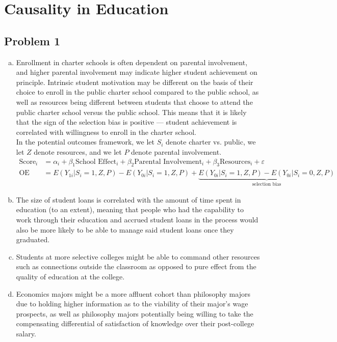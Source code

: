 \documentclass[8pt]{extarticle}
\title{}
\author{}
\date{}
\begin{document}
\section{Causality in Education}%
\subsection{Problem 1}%
\begin{enumerate}[(a)]
  \item Enrollment in charter schools is often dependent on parental involvement, and higher parental involvement may indicate higher student achievement on principle. Intrinsic student motivation may be different on the basis of their choice to enroll in the public charter school compared to the public school, as well as resources being different between students that choose to attend the public charter school versus the public school. This means that it is likely that the sign of the selection bias is positive --- student achievement is correlated with willingness to enroll in the charter school.\\

    In the potential outcomes framework, we let $S_i$ denote charter vs. public, we let $Z$ denote resources, and we let $P$ denote parental involvement.
    \begin{align*}
      \text{Score}_i &= \alpha_i + \beta_1\text{School Effect}_i + \beta_2\text{Parental Involvement}_i + \beta_3\text{Resources}_i + \varepsilon\\
      \text{OE} &= E(Y_{1i}|S_i=1,Z,P) - E(Y_{0i}|S_i=1,Z,P) + \underbrace{E(Y_{0i}|S_i=1,Z,P)-E(Y_{0i}|S_i=0,Z,P)}_{\text{selection bias}}
    \end{align*}
  \item The size of student loans is correlated with the amount of time spent in education (to an extent), meaning that people who had the capability to work through their education and accrued student loans in the process would also be more likely to be able to manage said student loans once they graduated.
  \item Students at more selective colleges might be able to command other resources such as connections outside the classroom as opposed to pure effect from the quality of education at the college.
  \item Economics majors might be a more affluent cohort than philosophy majors due to holding higher information as to the viability of their major's wage prospects, as well as philosophy majors potentially being willing to take the compensating differential of satisfaction of knowledge over their post-college salary.
\end{enumerate}
\end{document}

